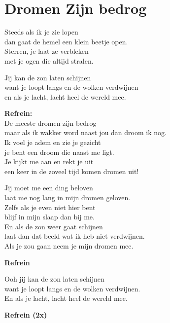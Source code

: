\section{Dromen Zijn bedrog}
Steeds als ik je zie lopen\\
dan gaat de hemel een klein beetje open.\\
Sterren, je laat ze verbleken\\
met je ogen die altijd stralen.

Jij kan de zon laten schijnen\\
want je loopt langs en de wolken verdwijnen\\
en als je lacht, lacht heel de wereld mee.

\textbf{Refrein:}\\
De meeste dromen zijn bedrog\\
maar als ik wakker word naast jou dan droom ik nog.\\
Ik voel je adem en zie je gezicht\\
je bent een droom die naast me ligt.\\
Je kijkt me aan en rekt je uit\\
een keer in de zoveel tijd komen dromen uit!

Jij moet me een ding beloven\\
laat me nog lang in mijn dromen geloven.\\
Zelfs als je even niet hier bent\\
blijf in mijn slaap dan bij me.\\
En als de zon weer gaat schijnen\\
laat dan dat beeld wat ik heb niet verdwijnen.\\
Als je zou gaan neem je mijn dromen mee.

\textbf{Refrein}

Ooh jij kan de zon laten schijnen\\
want je loopt langs en de wolken verdwijnen.\\
En als je lacht, lacht heel de wereld mee.

\textbf{Refrein (2x)}
